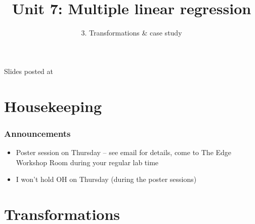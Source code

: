 \documentclass[11pt,containsverbatim,handout,xcolor=xelatex,dvipsnames,table]{beamer}
\title{Unit 7: Multiple linear regression}
\subtitle{3. Transformations \& case study}
\author{\CourseName}
\date{}
\institute{\InstituteName}
\begin{document}



\begin{frame}[plain]

\titlepage

\vfill

{\scriptsize {} \hfill Slides posted at  \webURL{\CourseSite}}

\addtocounter{framenumber}{-1} 

\end{frame}


\section{Housekeeping}


\begin{frame}
\frametitle{Announcements}

\begin{itemize}

\item Poster session on Thursday -- see email for details, come to The Edge Workshop Room during
your regular lab time

\item I won't hold OH on Thursday (during the poster sessions)

\end{itemize}

\end{frame}


\section{Transformations}

\end{document}
